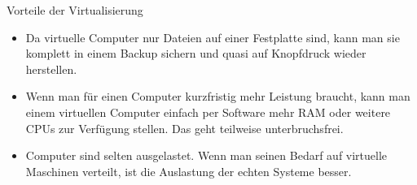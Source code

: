 \begin{frame}[<+->]{Vorteile der Virtualisierung}
  \begin{itemize}
    \item Da virtuelle Computer nur Dateien auf einer Festplatte sind, kann man sie komplett in einem Backup sichern und quasi auf Knopfdruck wieder herstellen.
    \item Wenn man für einen Computer kurzfristig mehr Leistung braucht, kann man einem virtuellen Computer einfach per Software mehr RAM oder weitere CPUs zur Verfügung stellen. Das geht teilweise unterbruchsfrei.
    \item Computer sind selten ausgelastet. Wenn man seinen Bedarf auf virtuelle Maschinen verteilt, ist die Auslastung der echten Systeme besser.
  \end{itemize}
\end{frame}

